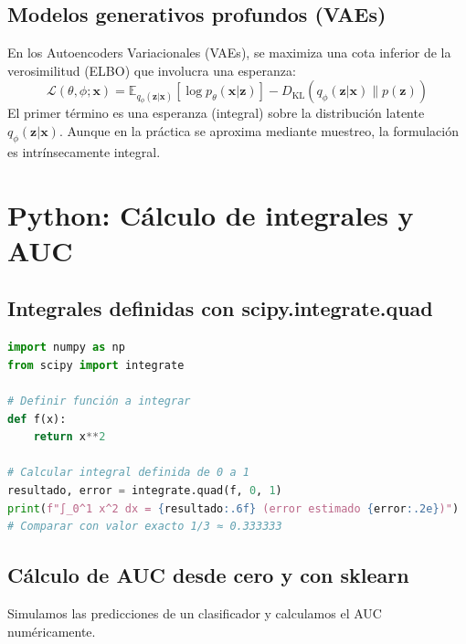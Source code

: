 \documentclass[12pt,a4paper,openany,oneside]{book}
\begin{document}
\subsection{Modelos generativos profundos (VAEs)}
En los Autoencoders Variacionales (VAEs), se maximiza una cota inferior de la verosimilitud (ELBO) que involucra una esperanza:
\[
\mathcal{L}(\theta, \phi; \mathbf{x}) = \mathbb{E}_{q_\phi(\mathbf{z}|\mathbf{x})} [\log p_\theta(\mathbf{x}|\mathbf{z})] - D_{\text{KL}}(q_\phi(\mathbf{z}|\mathbf{x}) \| p(\mathbf{z}))
\]
El primer término es una esperanza (integral) sobre la distribución latente $q_\phi(\mathbf{z}|\mathbf{x})$. Aunque en la práctica se aproxima mediante muestreo, la formulación es intrínsecamente integral.

\section{Python: Cálculo de integrales y AUC}

\subsection{Integrales definidas con scipy.integrate.quad}
\begin{lstlisting}[language=Python]
import numpy as np
from scipy import integrate

# Definir función a integrar
def f(x):
    return x**2

# Calcular integral definida de 0 a 1
resultado, error = integrate.quad(f, 0, 1)
print(f"∫_0^1 x^2 dx = {resultado:.6f} (error estimado {error:.2e})")
# Comparar con valor exacto 1/3 ≈ 0.333333
\end{lstlisting}

\subsection{Cálculo de AUC desde cero y con sklearn}
Simulamos las predicciones de un clasificador y calculamos el AUC numéricamente.
\end{document}
